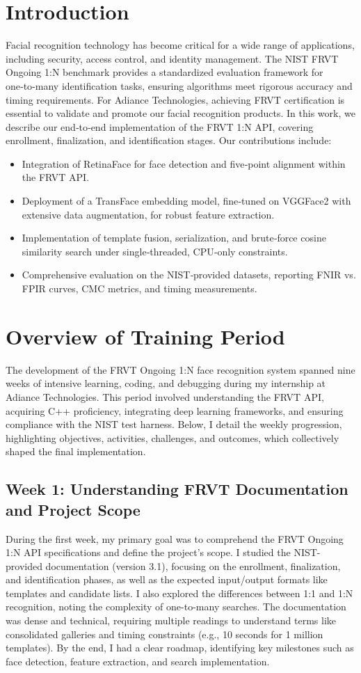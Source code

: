 \documentclass[conference]{IEEEtran}
\begin{document}
\section{Introduction}
Facial recognition technology has become critical for a wide range of applications, including security, access control, and identity management. The NIST FRVT Ongoing 1:N benchmark provides a standardized evaluation framework for one‑to‑many identification tasks, ensuring algorithms meet rigorous accuracy and timing requirements. For Adiance Technologies, achieving FRVT certification is essential to validate and promote our facial recognition products. In this work, we describe our end‑to‑end implementation of the FRVT 1:N API, covering enrollment, finalization, and identification stages. Our contributions include:
\begin{itemize}
  \item Integration of RetinaFace for face detection and five‑point alignment within the FRVT API.
  \item Deployment of a TransFace embedding model, fine‑tuned on VGGFace2 with extensive data augmentation, for robust feature extraction.
  \item Implementation of template fusion, serialization, and brute‑force cosine similarity search under single‑threaded, CPU‑only constraints.
  \item Comprehensive evaluation on the NIST‑provided datasets, reporting FNIR vs. FPIR curves, CMC metrics, and timing measurements.
\end{itemize}
\section{Overview of Training Period}
The development of the FRVT Ongoing 1:N face recognition system spanned nine weeks of intensive learning, coding, and debugging during my internship at Adiance Technologies. This period involved understanding the FRVT API, acquiring C++ proficiency, integrating deep learning frameworks, and ensuring compliance with the NIST test harness. Below, I detail the weekly progression, highlighting objectives, activities, challenges, and outcomes, which collectively shaped the final implementation.

\subsection{Week 1: Understanding FRVT Documentation and Project Scope}
During the first week, my primary goal was to comprehend the FRVT Ongoing 1:N API specifications and define the project’s scope. I studied the NIST-provided documentation (version 3.1), focusing on the enrollment, finalization, and identification phases, as well as the expected input/output formats like templates and candidate lists. I also explored the differences between 1:1 and 1:N recognition, noting the complexity of one-to-many searches. The documentation was dense and technical, requiring multiple readings to understand terms like consolidated galleries and timing constraints (e.g., 10 seconds for 1 million templates). By the end, I had a clear roadmap, identifying key milestones such as face detection, feature extraction, and search implementation.
\end{document}
